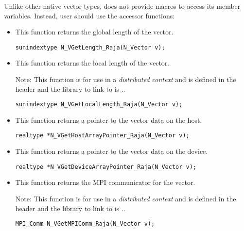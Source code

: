 Unlike other native {\sundials} vector types, {\nvecraja} does not provide macros
to access its member variables. Instead, user should use the accessor functions:
\begin{itemize}


\item {}

 This function returns the global length of the vector.

 \verb|sunindextype N_VGetLength_Raja(N_Vector v);|


\item {}

 This function returns the local length of the vector.
    
 Note: This function is for use in a \textit{distributed context} and
 is defined in the header  and the library
 to link to is ..

 \verb|sunindextype N_VGetLocalLength_Raja(N_Vector v);|


\item {}

 This function returns a pointer to the vector data on the host.

 \verb|realtype *N_VGetHostArrayPointer_Raja(N_Vector v);|



\item {}

 This function returns a pointer to the vector data on the device.

 \verb|realtype *N_VGetDeviceArrayPointer_Raja(N_Vector v);|


\item {}

 This function returns the MPI communicator for the vector.
 
    
 Note: This function is for use in a \textit{distributed context}
 and is defined in the header  and the
 library to link to is ..

 \verb|MPI_Comm N_VGetMPIComm_Raja(N_Vector v);|
\end{itemize}

